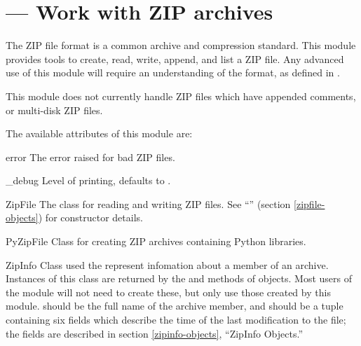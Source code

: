 \section{ ---
         Work with ZIP archives}



The ZIP file format is a common archive and compression standard.
This module provides tools to create, read, write, append, and list a
ZIP file.  Any advanced use of this module will require an
understanding of the format, as defined in
.

This module does not currently handle ZIP files which have appended
comments, or multi-disk ZIP files.

The available attributes of this module are:

\begin{excdesc}{error}
  The error raised for bad ZIP files.
\end{excdesc}

\begin{datadesc}{_debug}
  Level of printing, defaults to .
\end{datadesc}

\begin{classdesc}{ZipFile}{\unspecified}
  The class for reading and writing ZIP files.  See
  ``'' (section \ref{zipfile-objects}) for
  constructor details.
\end{classdesc}

\begin{classdesc}{PyZipFile}{\unspecified}
  Class for creating ZIP archives containing Python libraries.
\end{classdesc}

\begin{classdesc}{ZipInfo}{}
  Class used the represent infomation about a member of an archive.
  Instances of this class are returned by the  and
   methods of  objects.  Most users
  of the  module will not need to create these, but
  only use those created by this module.
   should be the full name of the archive member, and
   should be a tuple containing six fields which
  describe the time of the last modification to the file; the fields
  are described in section \ref{zipinfo-objects}, ``ZipInfo Objects.''
\end{classdesc}

